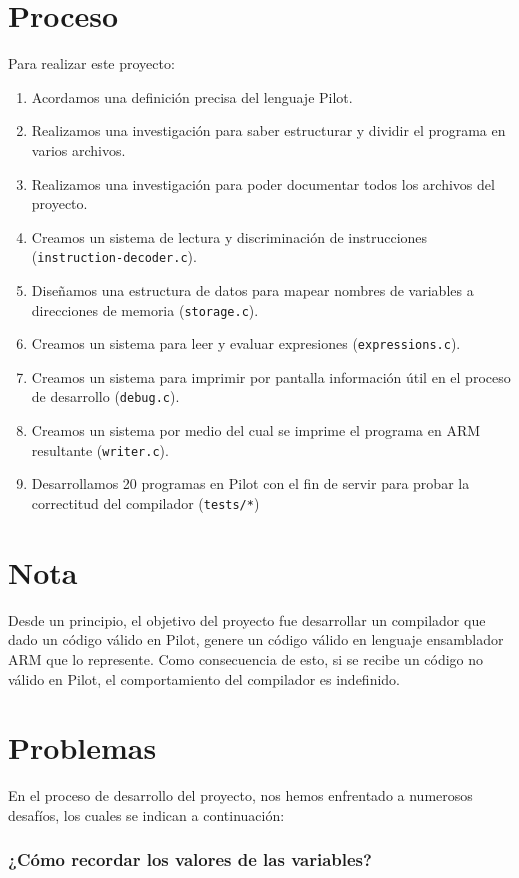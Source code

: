 \documentclass[12pt,spanish]{article}
\begin{document}
\section{Proceso}
Para realizar este proyecto:
\begin{enumerate}
\item{Acordamos una definición precisa del lenguaje Pilot.}
\item{Realizamos una investigación para saber estructurar y dividir el programa en varios archivos.}
\item{Realizamos una investigación para poder documentar todos los archivos del proyecto.}
\item{Creamos un sistema de lectura y discriminación de instrucciones (\texttt{instruction-decoder.c}).}
\item{Diseñamos una estructura de datos para mapear nombres de variables a direcciones de memoria (\texttt{storage.c}).}
\item{Creamos un sistema para leer y evaluar expresiones (\texttt{expressions.c}).}
\item{Creamos un sistema para imprimir por pantalla información útil en el proceso de desarrollo (\texttt{debug.c}).}
\item{Creamos un sistema por medio del cual se imprime el programa en ARM resultante (\texttt{writer.c}).}
\item{Desarrollamos 20 programas en Pilot con el fin de servir para probar la correctitud del compilador (\texttt{tests/*})}
\end{enumerate}

\section{Nota}
Desde un principio, el objetivo del proyecto fue desarrollar un compilador que dado un código válido en Pilot, genere un código válido en lenguaje ensamblador ARM que lo represente. Como consecuencia de esto, si se recibe un código no válido en Pilot, el comportamiento del compilador es indefinido.

\section{Problemas}
En el proceso de desarrollo del proyecto, nos hemos enfrentado a numerosos desafíos, los cuales se indican a continuación:
\subsubsection{¿Cómo recordar los valores de las variables?}
\end{document}

